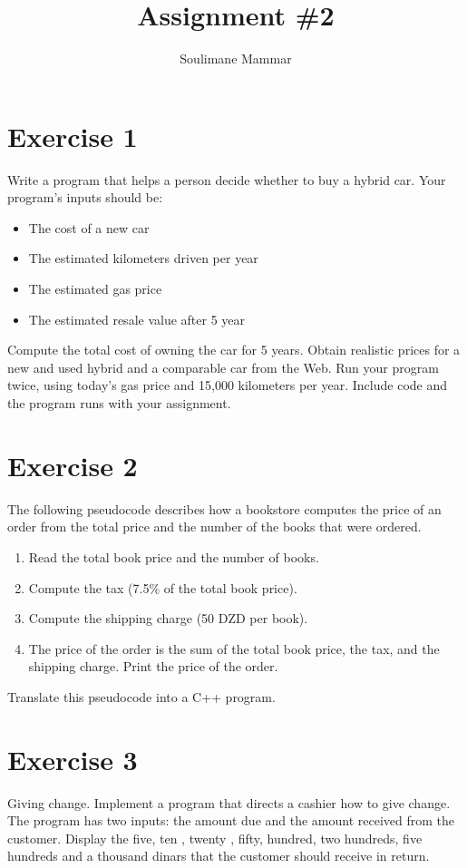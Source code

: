 \documentclass[10pt,a4paper]{article}
\title{Assignment \#2}
\author{Soulimane Mammar}
\begin{document}
	\maketitle
	\section*{Exercise 1}
	Write a program that helps a person decide whether to buy a hybrid car. Your
	program’s inputs should be:
	\begin{itemize}
		\item The cost of a new car
		\item The estimated kilometers driven per year
		\item The estimated gas price
		\item The estimated resale value after 5 year
	\end{itemize}
	Compute the total cost of owning the car for 5 years. Obtain realistic prices for a new and used hybrid and a comparable car from the Web. Run your
	program twice, using today’s gas price and 15,000 kilometers per year. Include code and the program runs with your assignment.
	
	\section*{Exercise 2}
	The following pseudocode describes how a bookstore computes the price of an order from the total price and the number of the books that were ordered.
	\begin{enumerate}
		\item Read the total book price and the number of books.
		\item Compute the tax (7.5\% of the total book price).
		\item Compute the shipping charge (50 DZD per book).
		\item The price of the order is the sum of the total book price, the tax, and the shipping charge. Print the price of the order.
	\end{enumerate}
	Translate this pseudocode into a C++ program.
	
	\section*{Exercise 3}
	Giving change. Implement a program that directs a cashier how to give change. The program has two inputs: the	amount due and the amount received from the customer.
	Display the five, ten , twenty , fifty, hundred, two hundreds, five hundreds and a thousand dinars that the customer should receive in return.
	
\end{document}
